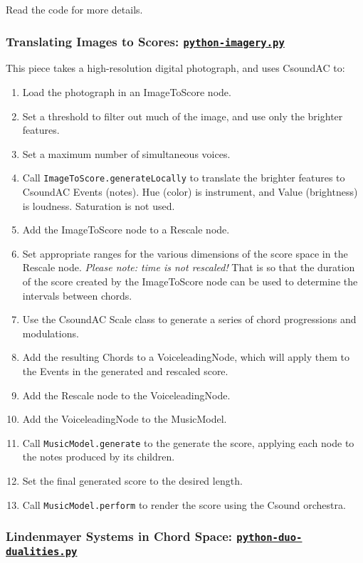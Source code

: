 \documentclass[letterpaper,10pt,DIV=12,parskip=half]{scrartcl}
\begin{document}
Read the code for more details.

\subsubsection{Translating Images to Scores:  \href{https://github.com/gogins/csound-ac/blob/master/user-guide/python-imagery.py}{\lstinline|python-imagery.py|}}

This piece takes a high-resolution digital photograph, and uses CsoundAC to:

\begin{enumerate}
\item Load the photograph in an ImageToScore node.
\item Set a threshold to filter out much of the image, and use only the brighter features.
\item Set a maximum number of simultaneous voices.
\item Call \lstinline|ImageToScore.generateLocally| to translate  the brighter features to CsoundAC Events (notes). Hue (color) is instrument, and Value (brightness) is loudness. Saturation is not used.
\item Add the ImageToScore node to a Rescale node.
\item Set appropriate ranges for the various dimensions of the score space in the Rescale node. \emph{Please note: time is not rescaled!} That is so that the duration of the score created by the ImageToScore node can be used to determine the intervals between chords.
\item Use the CsoundAC Scale class to generate a series of chord progressions and modulations.
\item Add the resulting Chords to a VoiceleadingNode, which will apply them to the Events in the generated and rescaled score.
\item Add the Rescale node to the VoiceleadingNode.
\item Add the VoiceleadingNode to the MusicModel.
\item Call \lstinline|MusicModel.generate| to the generate the score, applying each node to the notes produced by its children.
\item Set the final generated score to the desired length.
\item Call \lstinline|MusicModel.perform| to render the score using the Csound orchestra.

\end{enumerate}
\subsubsection{Lindenmayer Systems in Chord Space: \href{https://github.com/gogins/csound-ac/blob/master/user-guide/python-duo-dualities.py}{\lstinline|python-duo-dualities.py|}}
\end{document}
